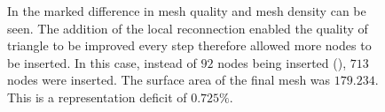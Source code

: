 \begin{figure}[h!]
  \centering
  \label{fig_NodeSmoothing}
 

In  the marked difference in mesh quality and mesh
density can be seen. The addition of the local reconnection enabled the
quality of triangle to be improved every step therefore allowed more
nodes to be inserted. In this case, instead of $92$ nodes being inserted
(), $713$ nodes were inserted. The surface area of the
final mesh was $179.234$. This is a representation deficit of $0.725\%$.
\end{figure}
